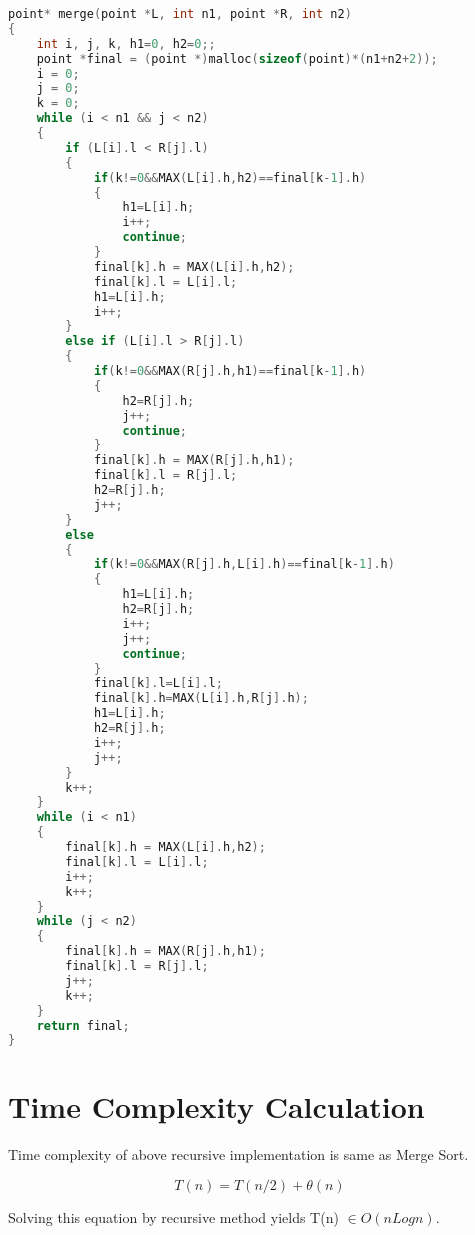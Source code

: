 \documentclass{article}
\begin{document}
\begin{lstlisting}[language=c, caption=merging function]
point* merge(point *L, int n1, point *R, int n2)
{
    int i, j, k, h1=0, h2=0;;
    point *final = (point *)malloc(sizeof(point)*(n1+n2+2));
    i = 0;
    j = 0;
    k = 0;
    while (i < n1 && j < n2)
    {
        if (L[i].l < R[j].l)
        {
            if(k!=0&&MAX(L[i].h,h2)==final[k-1].h)
            {
                h1=L[i].h;
                i++;
                continue;         
            }
            final[k].h = MAX(L[i].h,h2);
            final[k].l = L[i].l;
            h1=L[i].h;
            i++;
        }
        else if (L[i].l > R[j].l)
        {
            if(k!=0&&MAX(R[j].h,h1)==final[k-1].h)
            {
                h2=R[j].h;
                j++;
                continue;
            }
            final[k].h = MAX(R[j].h,h1);
            final[k].l = R[j].l;
            h2=R[j].h;
            j++;
        }
        else
        {
            if(k!=0&&MAX(R[j].h,L[i].h)==final[k-1].h)
            {
                h1=L[i].h;
                h2=R[j].h;
                i++;
                j++;
                continue;
            }
            final[k].l=L[i].l;
            final[k].h=MAX(L[i].h,R[j].h);
            h1=L[i].h;
            h2=R[j].h;
            i++;
            j++;
        }
        k++;
    }
    while (i < n1)
    {
        final[k].h = MAX(L[i].h,h2);
        final[k].l = L[i].l;
        i++;
        k++;
    }
    while (j < n2)
    {
        final[k].h = MAX(R[j].h,h1);
        final[k].l = R[j].l;
        j++;
        k++;
    }
    return final;
}
\end{lstlisting}

\section{Time Complexity Calculation}

Time complexity of above recursive implementation is same as Merge Sort.

\[ T(n) = T(n/2) + \theta(n) \]

Solving this equation by recursive method yields T(n) $\in O(nLogn)$.
\end{document}
